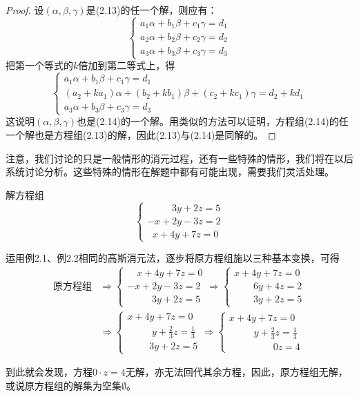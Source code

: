 \begin{proof}
    设$(\alpha,\beta,\gamma)$是(2.13)的任一个解，则应有：
\[    \begin{cases}
    a_1\alpha+b_1\beta+c_1\gamma=d_1\\   
     a_2\alpha+b_2\beta+c_2\gamma=d_2\\    
    a_3\alpha+b_3\beta+c_3\gamma=d_3
  \end{cases}\]
把第一个等式的$k$倍加到第二等式上，得
\[    \begin{cases}
    a_1\alpha+b_1\beta+c_1\gamma=d_1\\  
     (a_2+ka_1)\alpha+(b_2+kb_1)\beta+(c_2+kc_1)\gamma=d_2+kd_1\\
    a_3\alpha+b_3\beta+c_3\gamma=d_3
\end{cases} \]
这说明$(\alpha,\beta,\gamma)$也是(2.14)的一个解。用类似的方法可以证明，方程组(2.14)的任一个解也是方程组(2.13)的解，因此(2.13)与(2.14)是同解的。
\end{proof}

注意，我们讨论的只是一般情形的消元过程，还有一些特殊的情形，我们将在以后系统讨论分析。这些特殊的情形在解题中都有可能出现，需要我们灵活处理。

\begin{example}
    解方程组
    \[\begin{cases}
     \qquad \;\; 3y+2z=5\\-x+2y-3z=2\\\;\; x+4y+7z=0 
    \end{cases}\]
\end{example}


\begin{solution}
运用例2.1、例2.2相同的高斯消元法，逐步将原方程组施以三种基本变换，可得
\[\begin{split}
\text{原方程组}& \Rightarrow \begin{cases}
  \quad   x+4y+7z=0\\-x+2y-3z=2\\\qquad \;\;3y+2z=5
\end{cases} \Rightarrow \begin{cases}
    x+4y+7z=0\\\qquad  6y+4z=2\\\qquad  3y+2z=5
\end{cases}\\
&\Rightarrow \begin{cases}
    x+4y+7z=0\\\qquad \;\; y+\frac{2}{3}z=\frac{1}{3}\\\qquad \;3y+2z=5 
\end{cases}\Rightarrow \begin{cases}
    x+4y+7z=0\\\qquad \;\;y+\frac{2}{3}z=\frac{1}{3}\\\qquad \;\;\qquad  0z=4
\end{cases}
\end{split}\]

到此就会发现，方程$0\cdot z=4$无解，亦无法回代其余方程，因此，原方程组无解，或说原方程组的解集为空集$\emptyset$。
\end{solution}
    

